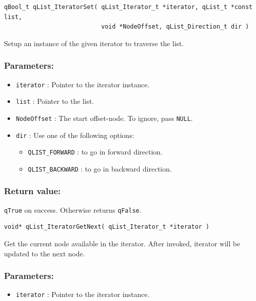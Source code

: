 \documentclass{article}
\begin{document}
\noindent\hrulefill

\begin{lstlisting}[style=CStyle]
qBool_t qList_IteratorSet( qList_Iterator_t *iterator, qList_t *const list, 
                           void *NodeOffset, qList_Direction_t dir )
\end{lstlisting} 

Setup an instance of the given iterator to traverse the list.

\subsubsection*{Parameters:}
\begin{itemize}
    \item \lstinline{iterator} : Pointer to the iterator instance. 
    \item \lstinline{list} : Pointer to the list.
    \item \lstinline{NodeOffset} : The start offset-node. To ignore, pass \lstinline{NULL}.
    \item \lstinline{dir} : Use one of the following options:
        \begin{itemize}
            \item \lstinline{QLIST_FORWARD} : to go in forward direction.
            \item \lstinline{QLIST_BACKWARD} : to go in backward direction.
        \end{itemize}
\end{itemize}

\subsubsection*{Return value:}
\lstinline{qTrue} on success. Otherwise returns \lstinline{qFalse}. 

\noindent\hrulefill

\begin{lstlisting}[style=CStyle]
void* qList_IteratorGetNext( qList_Iterator_t *iterator )
\end{lstlisting} 

Get the current node available in the iterator. After invoked, iterator will be updated to the next node.

\subsubsection*{Parameters:}
\begin{itemize}
    \item \lstinline{iterator} : Pointer to the iterator instance. 
\end{itemize}
\end{document}
